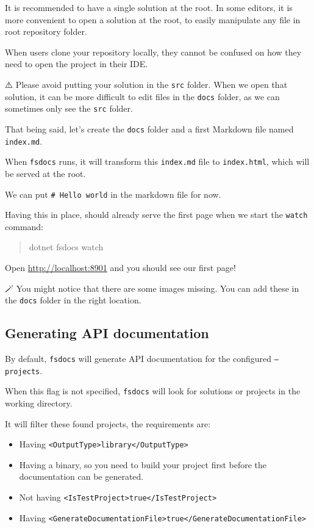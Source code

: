 \documentclass{article}
\begin{document}
It is recommended to have a single solution at the root. In some editors, it is more convenient to open a solution at the root, to easily manipulate any file in root repository folder.

When users clone your repository locally, they cannot be confused on how they need to open the project in their IDE.


⚠️ Please avoid putting your solution in the \texttt{src} folder. When we open that solution, it can be more difficult to edit files in the \texttt{docs} folder, as we can sometimes only see the \texttt{src} folder.


That being said, let's create the \texttt{docs} folder and a first Markdown file named \texttt{index.md}.

When \texttt{fsdocs} runs, it will transform this \texttt{index.md} file to \texttt{index.html}, which will be served at the root.


We can put \texttt{\# Hello world} in the markdown file for now.


Having this in place, should already serve the first page when we start the \texttt{watch} command:
\begin{quote}


dotnet fsdocs watch
\end{quote}



Open \href{http://localhost:8901}{\href{http://localhost:8901}{http://localhost:8901}} and you should see our first page!


🪄 You might notice that there are some images missing. You can add these in the \texttt{docs} folder in the right location.
\subsection*{Generating API documentation}



By default, \texttt{fsdocs} will generate API documentation for the configured \texttt{--projects}.

When this flag is not specified, \texttt{fsdocs} will look for solutions or projects in the working directory.

It will filter these found projects, the requirements are:
\begin{itemize}
\item Having \texttt{<OutputType>library</OutputType>}

\item Having a binary, so you need to build your project first before the documentation can be generated.

\item Not having \texttt{<IsTestProject>true</IsTestProject>}

\item Having \texttt{<GenerateDocumentationFile>true</GenerateDocumentationFile>}

\end{itemize}
\end{document}

